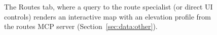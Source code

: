 \begin{figure}[ht]
\centering
{}
\caption[Routes tab]{The Routes tab, where a query to the route specialist (or direct UI controls) renders an interactive map with an elevation profile from the routes MCP server (Section~\ref{sec:data:other}).}\label{fig:screenshot_routes}
\end{figure}
